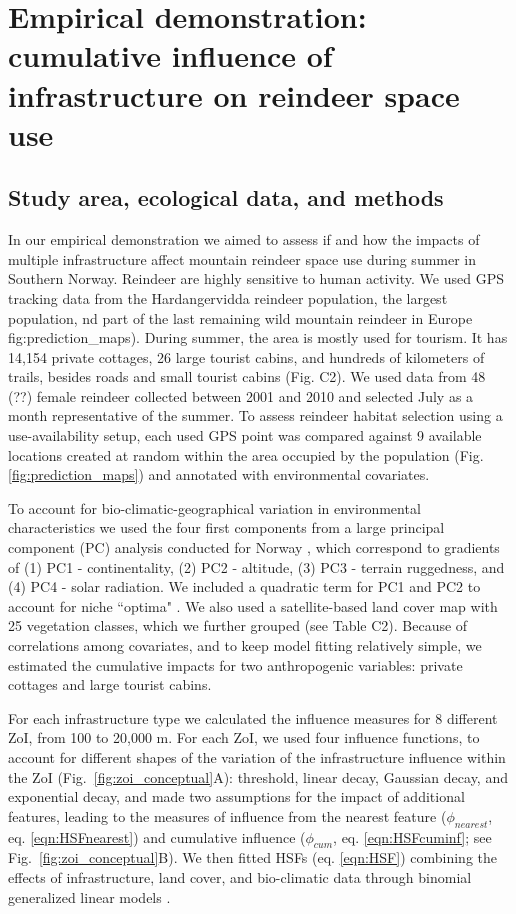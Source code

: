 \documentclass[titlepage]{article}
\begin{document}
\section{Empirical demonstration: cumulative influence of infrastructure on reindeer space use}

\subsection{Study area, ecological data, and methods}

In our empirical demonstration we aimed to assess if and how the impacts of multiple infrastructure affect mountain reindeer space use during summer in Southern Norway. Reindeer are highly sensitive to human activity. We used GPS tracking data from the Hardangervidda reindeer population, the largest population, nd part of the last remaining wild mountain reindeer in Europe {fig:prediction_maps}). During summer, the area is mostly used for tourism. It has 14,154 private cottages, 26 large tourist cabins, and hundreds of kilometers of trails, besides roads and small tourist cabins (Fig. C2). We used data from 48 (??) female reindeer collected between 2001 and 2010 \citep[see][for further details]{panzacchi_searching_2015} and selected July as a month representative of the summer. To assess reindeer habitat selection using a use-availability setup, each used GPS point was compared against 9 available locations created at random within the area occupied by the population (Fig. \ref{fig:prediction_maps}) and annotated with environmental covariates.

To account for bio-climatic-geographical  variation in environmental characteristics we used the four first components from a large principal component (PC) analysis conducted for Norway \citep{bakkestuen_step-less_2008}, which correspond to gradients of (1) PC1 - continentality, (2) PC2 - altitude, (3) PC3 - terrain ruggedness, and (4) PC4 - solar radiation. We included a quadratic term for PC1 and PC2 to account for niche ``optima" \citep[\textit{sensu}][]{panzacchi_searching_2015}. We also used a satellite-based land cover map with 25 vegetation classes, which we further grouped (see Table C2). Because of correlations among covariates, and to keep model fitting relatively simple, we estimated the cumulative impacts for two anthropogenic variables: private cottages and large tourist cabins.

For each infrastructure type we calculated the influence measures for 8 different ZoI, from 100 to 20,000 m. For each ZoI, we used four influence functions, to account for different shapes of the variation of the infrastructure influence within the ZoI (Fig.~\ref{fig:zoi_conceptual}A): threshold, linear decay, Gaussian decay, and exponential decay, and made two assumptions for the impact of additional features, leading to the measures of influence from the nearest feature ($\phi_{nearest}$, eq. \ref{eqn:HSFnearest}) and cumulative influence ($\phi_{cum}$, eq. \ref{eqn:HSFcuminf}; see Fig.~\ref{fig:zoi_conceptual}B). We then fitted HSFs (eq. \ref{eqn:HSF}) combining the effects of infrastructure, land cover, and bio-climatic data through binomial generalized linear models \citep{fieberg_how_2021}. 
\end{document}
